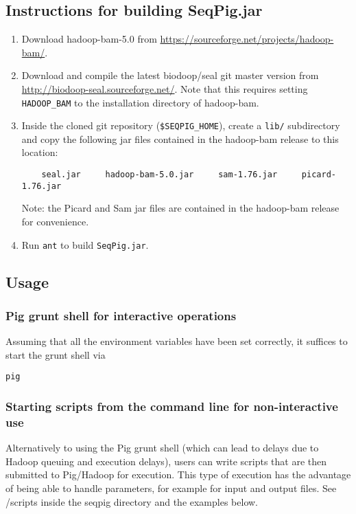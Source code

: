 \subsection{Instructions for building SeqPig.jar}

\begin{enumerate}
\item Download hadoop-bam-5.0 from \url{https://sourceforge.net/projects/hadoop-bam/}.

\item Download and compile the latest biodoop/seal git master version from
 \url{http://biodoop-seal.sourceforge.net/}. Note that this requires
 setting {\tt HADOOP\_BAM} to the installation directory of hadoop-bam.

\item Inside the cloned git repository ({\tt \$SEQPIG\_HOME}), create a
{\tt lib/} subdirectory and copy the following jar files contained in the
hadoop-bam release to this location:
%
\begin{lstlisting} 
    seal.jar     hadoop-bam-5.0.jar     sam-1.76.jar     picard-1.76.jar
\end{lstlisting}
%
Note: the Picard and Sam jar files are contained in the hadoop-bam release
for convenience.

\item Run {\tt ant} to build {\tt SeqPig.jar}.
\end{enumerate}

\subsection{Usage}

\subsubsection{Pig grunt shell for interactive operations}
Assuming that all the environment variables have been set correctly, it suffices
to start the grunt shell via
%
\begin{lstlisting}
pig
\end{lstlisting}
%
\subsubsection{Starting scripts from the command line for non-interactive use}
Alternatively to using the Pig grunt shell (which can lead to delays due to
Hadoop queuing and execution delays), users can write scripts that are
then submitted to Pig/Hadoop for execution. This type of execution has
the advantage of being able to handle parameters, for example for input
and output files. See /scripts inside the seqpig directory and the
examples below.
